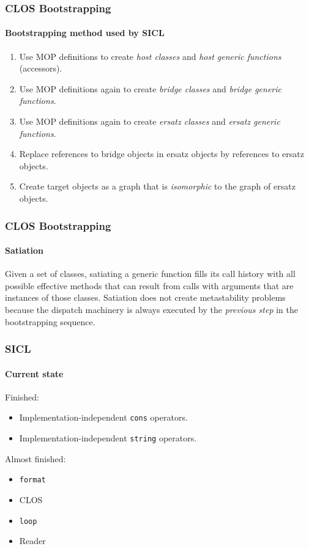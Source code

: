 \documentclass[12pt]{beamer}
\begin{document}
\begin{frame}
  \frametitle{CLOS Bootstrapping}
  \framesubtitle{Bootstrapping method used by SICL}

  \begin{enumerate}
  \item Use MOP definitions to create \emph{host classes} and \emph{host generic
    functions} (accessors).
  \item Use MOP definitions again to create \emph{bridge classes} and
    \emph{bridge generic functions}.  
  \item Use MOP definitions again to create \emph{ersatz classes} and
    \emph{ersatz generic functions}.  
  \item Replace references to bridge objects in ersatz objects by
    references to ersatz objects.
  \item Create target objects as a graph that is \emph{isomorphic} to
    the graph of ersatz objects.
  \end{enumerate}

\end{frame}
\begin{frame}
  \frametitle{CLOS Bootstrapping}
  \framesubtitle{Satiation}

Given a set of classes, satiating a generic function fills its call
history with all possible effective methods that can result from calls
with arguments that are instances of those classes. 
\vskip 0.5cm
Satiation does not create metastability problems because the dispatch
machinery is always executed by the \emph{previous step} in the
bootstrapping sequence.
\end{frame}
\begin{frame}
  \frametitle{SICL}
  \framesubtitle{Current state}
Finished:
\vskip 0.25cm
\begin{itemize}
\item Implementation-independent \texttt{cons} operators. 
\item Implementation-independent \texttt{string} operators.
\end{itemize}
\vskip 0.5cm
Almost finished:
\vskip 0.25cm
\begin{itemize}
\item \texttt{format}
\item CLOS
\item \texttt{loop}
\item Reader
\end{itemize}

\end{frame}
\end{document}
